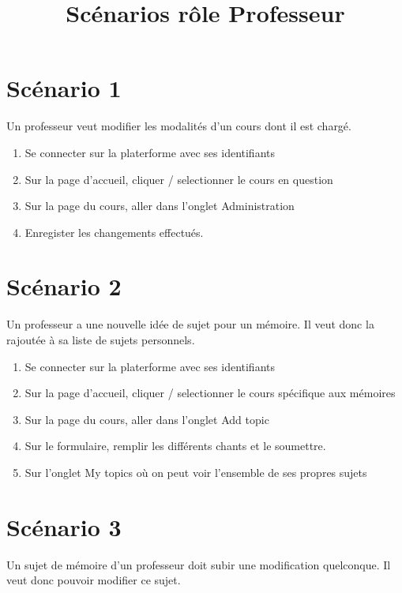 \documentclass[a4paper, 11pt]{article}
\title{Scénarios rôle \bf Professeur}
\author{}
\begin{document}
\maketitle

\section*{Scénario 1}
Un professeur veut modifier les modalités d'un cours dont il est chargé.

\begin{tcolorbox}
    \begin{enumerate}
        \item Se connecter sur la platerforme avec ses identifiants
        \item Sur la page d'accueil, cliquer / selectionner le cours en question
        \item Sur la page du cours, aller dans l'onglet \og Administration\fg{}
        \item Enregister les changements effectués.
    \end{enumerate}
\end{tcolorbox}

\section*{Scénario 2}
Un professeur a une nouvelle idée de sujet pour un mémoire. Il veut donc la rajoutée à sa liste de sujets personnels.

\begin{tcolorbox}
    \begin{enumerate}
        \item Se connecter sur la platerforme avec ses identifiants
        \item Sur la page d'accueil, cliquer / selectionner le cours spécifique aux mémoires
        \item Sur la page du cours, aller dans l'onglet \og Add topic\fg{}
        \item Sur le formulaire, remplir les différents chants et le soumettre.
        \item Sur l'onglet \og My topics\fg{} où on peut voir l'ensemble de ses propres sujets
    \end{enumerate}
\end{tcolorbox}

\section*{Scénario 3}
Un sujet de mémoire d'un professeur doit subir une modification quelconque. Il veut donc pouvoir modifier ce sujet.
\end{document}
